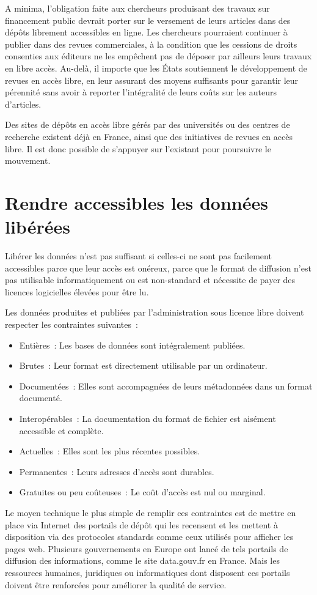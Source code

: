 A minima, l'obligation faite aux chercheurs produisant des travaux sur financement public devrait porter sur le versement de leurs articles dans des dépôts librement accessibles en ligne. Les chercheurs pourraient continuer à publier dans des revues commerciales, à la condition que les cessions de droits consenties aux éditeurs ne les empêchent pas de déposer par ailleurs leurs travaux en libre accès. Au-delà, il importe que les États soutiennent le développement de revues en accès libre, en leur assurant des moyens suffisants pour garantir leur pérennité sans avoir à reporter l'intégralité de leurs coûts sur les auteurs d'articles. 

Des sites de dépôts en accès libre gérés par des universités ou des centres de recherche existent déjà en France, ainsi que des initiatives de revues en accès libre. Il est donc possible de s’appuyer sur l’existant pour poursuivre le mouvement.


 \section{Rendre accessibles les données libérées}
Libérer les données n'est pas suffisant si celles-ci ne sont pas facilement accessibles parce que leur accès est onéreux, parce que le format de diffusion n'est pas utilisable informatiquement ou est non-standard et nécessite de payer des licences logicielles élevées pour être lu.

\begin{mesure}
Les données produites et publiées par l'administration sous licence libre doivent respecter les contraintes suivantes~:

\begin{itemize}
\item Entières~: Les bases de données sont intégralement publiées.
\item Brutes~: Leur format est directement utilisable par un ordinateur.
\item Documentées~: Elles sont accompagnées de leurs métadonnées dans un format documenté.
\item Interopérables~: La documentation du format de fichier est aisément accessible et complète. 
\item Actuelles~: Elles sont les plus récentes possibles.
\item Permanentes~: Leurs adresses d'accès sont durables.
\item Gratuites ou peu coûteuses~: Le coût d'accès est nul ou marginal.
\end{itemize}
\end{mesure}

Le moyen technique le plus simple de remplir ces contraintes est de mettre en place via Internet des portails de dépôt qui les recensent et les mettent à disposition via des protocoles standards comme ceux utilisés pour afficher les pages web. Plusieurs gouvernements en Europe ont lancé de tels portails de diffusion des informations, comme le site data.gouv.fr en France. Mais les ressources humaines, juridiques ou informatiques dont disposent ces portails doivent être renforcées pour améliorer la qualité de service.

